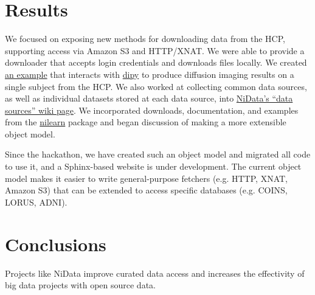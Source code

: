 \documentclass[twocolumn]{bmcart}%
\begin{document}
\section{Results}\label{results}

We focused on exposing new methods for downloading data from the HCP,
supporting access via Amazon S3 and HTTP/XNAT. We
were able to provide a downloader that accepts login credentials and
downloads files locally. We created
\href{https://github.com/arokem/nidata/blob/bcipolli-ohbm2015-ipynb/ipynb/hcp-fetcher-dwi.ipynb}{an
example} that interacts with \href{https://github.com/nipy/dipy}{dipy}
to produce diffusion imaging results on a single subject from the HCP.
We also worked at collecting common data sources, as well as individual
datasets stored at each data source, into
\href{https://github.com/nidata/nidata/wiki/Data-sources}{NiData's
``data sources'' wiki page}. We incorporated downloads, documentation,
and examples from the \href{http://github.com/nilearn/nilearn}{nilearn}
package and began discussion of making a more extensible object model.

Since the hackathon, we have created such an object model and migrated
all code to use it, and a Sphinx-based website is under development.
The current object model makes it easier to write general-purpose fetchers (e.g. HTTP, XNAT, Amazon S3) that can be extended to access specific databases (e.g. COINS, LORUS, ADNI).

\section{Conclusions}\label{conclusions}

Projects like NiData improve curated data access and increases the
effectivity of big data projects with open source data.

\end{document}
